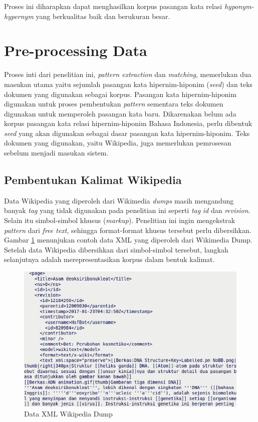 \noindent Proses ini diharapkan dapat menghasilkan korpus pasangan kata relasi \textit{hyponym-hypernym} yang berkualitas baik dan berukuran besar.


\section{Pre-processing Data}
Proses inti dari penelitian ini, \textit{pattern extraction} dan \textit{matching}, memerlukan dua masukan utama yaitu sejumlah pasangan kata hipernim-hiponim (\textit{seed}) dan teks dokumen yang digunakan sebagai korpus. Pasangan kata hipernim-hiponim digunakan untuk proses pembentukan \textit{pattern} sementara teks dokumen digunakan untuk memperoleh pasangan kata baru. Dikarenakan belum ada korpus pasangan kata relasi hipernim-hiponim Bahasa Indonesia, perlu dibentuk \textit{seed} yang akan digunakan sebagai dasar pasangan kata hipernim-hiponim. Teks dokumen yang digunakan, yaitu Wikipedia, juga memerlukan pemrosesan sebelum menjadi masukan sistem.

\subsection{Pembentukan Kalimat Wikipedia}
Data Wikipedia yang diperoleh dari Wikimedia \textit{dumps} masih mengandung banyak \textit{tag} yang tidak digunakan pada penelitian ini seperti \textit{tag} \textit{id} dan \textit{revision}. Selain itu simbol-simbol khusus (\textit{markup}). Penelitian ini ingin mengekstrak \textit{pattern} dari \textit{free text}, sehingga format-format khusus tersebut perlu dibersihkan. Gambar \ref{fig:wiki-dump} menunjukan contoh data XML yang diperoleh dari Wikimedia Dump. Setelah data Wikipedia dibersihkan dari simbol-simbol tersebut, langkah selanjutnya adalah merepresentasikan korpus dalam bentuk kalimat. 

\begin{figure}
    \centering
    \includegraphics[width=\linewidth]{pics/WikipediaDump}
    \caption{Data XML Wikipedia Dump}
    \label{fig:wiki-dump}
\end{figure}

